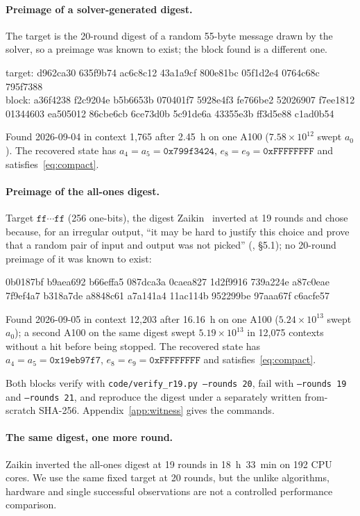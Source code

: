 \documentclass[11pt,a4paper]{article}
\newcommand{\hex}[1]{\texttt{#1}}
\begin{document}
\paragraph{Preimage of a solver-generated digest.}
The target is the 20-round digest of a random 55-byte message drawn by the
solver, so a preimage was known to exist; the block found is a different one.
\begin{center}\ttfamily\small
target: d962ca30 635f9b74 ac6c8c12 43a1a9cf 800e81bc 05f1d2e4 0764c68c 795f7388\\[3pt]
block:\phantom{ } a36f4238 f2c9204e b5b6653b 070401f7 5928e4f3 fe766be2 52026907 f7ee1812\\
\phantom{block: }01344603 ea505012 86cbe6cb 6ce73d0b 5c91de6a 43355e3b ff3d5e88 c1ad0b54
\end{center}
Found 2026-09-04 in context 1{,}765 after 2.45~h on one A100
($7.58\times10^{12}$ swept $a_0$).  The recovered state has
$a_4=a_5=\hex{0x799f3424}$, $e_8=e_9=\hex{0xFFFFFFFF}$ and satisfies~\eqref{eq:compact}.

\paragraph{Preimage of the all-ones digest.}
Target $\hex{ff}\cdots\hex{ff}$ (256 one-bits), the digest Zaikin~\cite{Zaikin2026}
inverted at 19 rounds and chose because, for an irregular output, ``it may be hard to justify
this choice and prove that a random pair of input and output was not picked''
(\cite{Zaikin2026}, \S5.1); no 20-round preimage of it
was known to exist:
\begin{center}\ttfamily\small
0b0187bf b9aea692 b66effa5 087dca3a 0caea827 1d2f9916 739a224e a87c0eae\\
7f9ef4a7 b318a7de a8848c61 a7a141a4 11ac114b 952299be 97aaa67f c6acfe57
\end{center}
Found 2026-09-05 in context 12{,}203 after 16.16~h on one A100
($5.24\times10^{13}$ swept $a_0$); a second A100 on the same digest swept
$5.19\times10^{13}$ in 12{,}075
contexts without a hit before being stopped.  The recovered state has $a_4=a_5=\hex{0x19eb97f7}$,
$e_8=e_9=\hex{0xFFFFFFFF}$ and satisfies~\eqref{eq:compact}.

Both blocks verify with \texttt{code/verify\_r19.py --rounds 20}, fail with
\texttt{--rounds 19} and \texttt{--rounds 21}, and reproduce the digest under
a separately written from-scratch SHA-256.  Appendix~\ref{app:witness} gives the
commands.

\paragraph{The same digest, one more round.}
Zaikin inverted the all-ones digest at 19 rounds in 18~h~33~min on 192 CPU
cores.  We use the same fixed target at 20 rounds, but the unlike algorithms,
hardware and single successful observations are not a controlled performance
comparison.
\end{document}
